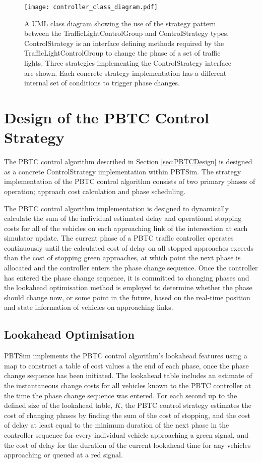 \begin{figure}[]
\centering
	\texttt{[image: controller\_class\_diagram.pdf]}
	\caption{ A UML class diagram showing the use of the strategy pattern between the TrafficLightControlGroup and ControlStrategy types. ControlStrategy is an interface defining methods required by the TrafficLightControlGroup to change the phase of a set of traffic lights. Three strategies implementing the ControlStrategy interface are shown. Each concrete strategy implementation has a different internal set of conditions to trigger phase changes. }
\label{controllerclassdiagram}
\end{figure}


\section{Design of the PBTC Control Strategy}

The PBTC control algorithm described in Section \ref{sec:PBTCDesign} is designed as a concrete ControlStrategy implementation within PBTSim. The strategy implementation of the PBTC control algorithm consists of two primary phases of operation; approach cost calculation and phase scheduling. 

The PBTC control algorithm implementation is designed to dynamically calculate the sum of the individual estimated delay and operational stopping costs for all of the vehicles on each approaching link of the intersection at each simulator update. The current phase of a PBTC traffic controller operates continuously until the calculated cost of delay on all stopped approaches exceeds than the cost of stopping green approaches, at which point the next phase is allocated and the controller enters the phase change sequence. Once the controller has entered the phase change sequence, it is  committed to changing phases and the lookahead optimisation method is employed to determine whether the phase should change now, or some point in the future, based on the real-time position and state information of vehicles on approaching links. 

\subsection{Lookahead Optimisation}

PBTSim implements the PBTC control algorithm's lookahead features using a map to construct a table of cost values a the end of each phase, once the phase change sequence has been initiated. The lookahead table includes an estimate of the instantaneous change costs for all vehicles known to the PBTC controller at the time the phase change sequence was entered. For each second up to the defined size of the lookahead table, $K$, the PBTC control strategy estimates the cost of changing phases by finding the sum of the cost of stopping, and the cost of delay at least equal to the minimum duration of the next phase in the controller sequence for every individual vehicle approaching a green signal, and the cost of delay for the duration of the current lookahead time for any vehicles approaching or queued at a red signal. 

